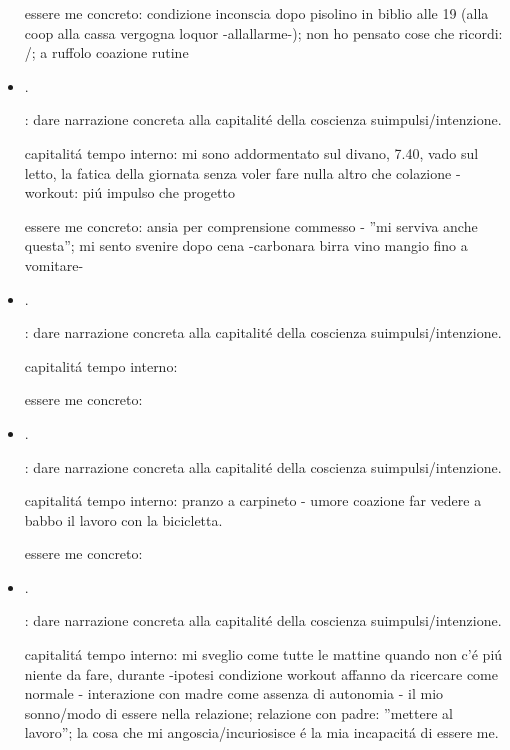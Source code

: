 \begin{itemize}
essere me concreto: condizione inconscia dopo pisolino in biblio alle 19 (alla coop alla cassa vergogna loquor -allallarme-); non ho pensato cose che ricordi: /; a ruffolo coazione rutine

\item {}.

: dare narrazione concreta alla capitalit\'e della coscienza suimpulsi/intenzione.

capitalit\'a tempo interno: mi sono addormentato sul divano, 7.40, vado sul letto, la fatica della giornata senza voler fare nulla altro che colazione - workout: pi\'u impulso che progetto

essere me concreto: ansia per comprensione commesso - ''mi serviva anche questa''; mi sento svenire dopo cena -carbonara birra vino mangio fino a vomitare-

\item {}.

: dare narrazione concreta alla capitalit\'e della coscienza suimpulsi/intenzione.

capitalit\'a tempo interno:

essere me concreto:

\item {}.

: dare narrazione concreta alla capitalit\'e della coscienza suimpulsi/intenzione.

capitalit\'a tempo interno: pranzo a carpineto - umore coazione far vedere a babbo il lavoro con la bicicletta.

essere me concreto:

\item {}.

: dare narrazione concreta alla capitalit\'e della coscienza suimpulsi/intenzione.

capitalit\'a tempo interno: mi sveglio come tutte le mattine quando non c'\'e pi\'u niente da fare, durante -ipotesi condizione workout affanno da ricercare come normale - interazione con madre come assenza di autonomia - il mio sonno/modo di essere nella relazione; relazione con padre: ''mettere al lavoro''; la cosa che mi angoscia/incuriosisce \'e la mia incapacit\'a di essere me.


\end{itemize}
